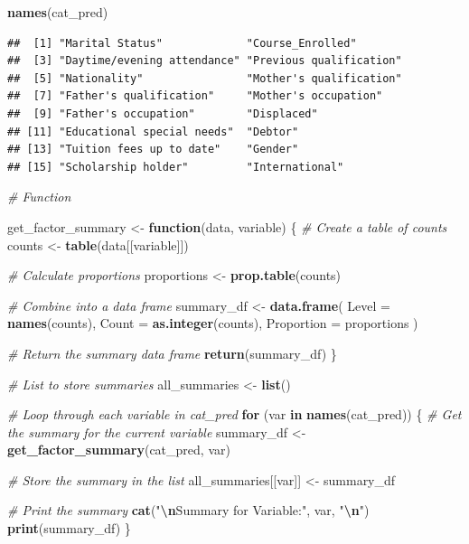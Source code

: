 \documentclass[
]{article}
\newenvironment{Shaded}{\begin{snugshade}}{\end{snugshade}}
\newcommand{\AttributeTok}[1]{\textcolor[rgb]{0.13,0.29,0.53}{#1}}
\newcommand{\CommentTok}[1]{\textcolor[rgb]{0.56,0.35,0.01}{\textit{#1}}}
\newcommand{\ControlFlowTok}[1]{\textcolor[rgb]{0.13,0.29,0.53}{\textbf{#1}}}
\newcommand{\FunctionTok}[1]{\textcolor[rgb]{0.13,0.29,0.53}{\textbf{#1}}}
\newcommand{\NormalTok}[1]{#1}
\newcommand{\OtherTok}[1]{\textcolor[rgb]{0.56,0.35,0.01}{#1}}
\newcommand{\SpecialCharTok}[1]{\textcolor[rgb]{0.81,0.36,0.00}{\textbf{#1}}}
\newcommand{\StringTok}[1]{\textcolor[rgb]{0.31,0.60,0.02}{#1}}
\begin{document}
\begin{Shaded}
\begin{Highlighting}[]
\FunctionTok{names}\NormalTok{(cat\_pred)}
\end{Highlighting}
\end{Shaded}

\begin{verbatim}
##  [1] "Marital Status"             "Course_Enrolled"           
##  [3] "Daytime/evening attendance" "Previous qualification"    
##  [5] "Nationality"                "Mother's qualification"    
##  [7] "Father's qualification"     "Mother's occupation"       
##  [9] "Father's occupation"        "Displaced"                 
## [11] "Educational special needs"  "Debtor"                    
## [13] "Tuition fees up to date"    "Gender"                    
## [15] "Scholarship holder"         "International"
\end{verbatim}

\begin{Shaded}
\begin{Highlighting}[]
\CommentTok{\# Function }

\NormalTok{get\_factor\_summary }\OtherTok{\textless{}{-}} \ControlFlowTok{function}\NormalTok{(data, variable) \{}
  \CommentTok{\# Create a table of counts}
\NormalTok{  counts }\OtherTok{\textless{}{-}} \FunctionTok{table}\NormalTok{(data[[variable]])}
  
  \CommentTok{\# Calculate proportions}
\NormalTok{  proportions }\OtherTok{\textless{}{-}} \FunctionTok{prop.table}\NormalTok{(counts)}
  
  \CommentTok{\# Combine into a data frame}
\NormalTok{  summary\_df }\OtherTok{\textless{}{-}} \FunctionTok{data.frame}\NormalTok{(}
    \AttributeTok{Level =} \FunctionTok{names}\NormalTok{(counts),}
    \AttributeTok{Count =} \FunctionTok{as.integer}\NormalTok{(counts),}
    \AttributeTok{Proportion =}\NormalTok{ proportions}
\NormalTok{  )}
  
  \CommentTok{\# Return the summary data frame}
  \FunctionTok{return}\NormalTok{(summary\_df)}
\NormalTok{\}}

\CommentTok{\# List to store summaries}
\NormalTok{all\_summaries }\OtherTok{\textless{}{-}} \FunctionTok{list}\NormalTok{()}

\CommentTok{\# Loop through each variable in cat\_pred}
\ControlFlowTok{for}\NormalTok{ (var }\ControlFlowTok{in} \FunctionTok{names}\NormalTok{(cat\_pred)) \{}
  \CommentTok{\# Get the summary for the current variable}
\NormalTok{  summary\_df }\OtherTok{\textless{}{-}} \FunctionTok{get\_factor\_summary}\NormalTok{(cat\_pred, var)}
  
  \CommentTok{\# Store the summary in the list}
\NormalTok{  all\_summaries[[var]] }\OtherTok{\textless{}{-}}\NormalTok{ summary\_df}
  
  \CommentTok{\# Print the summary}
  \FunctionTok{cat}\NormalTok{(}\StringTok{"}\SpecialCharTok{\textbackslash{}n}\StringTok{Summary for Variable:"}\NormalTok{, var, }\StringTok{"}\SpecialCharTok{\textbackslash{}n}\StringTok{"}\NormalTok{)}
  \FunctionTok{print}\NormalTok{(summary\_df)}
\NormalTok{\}}
\end{Highlighting}
\end{Shaded}
\end{document}
